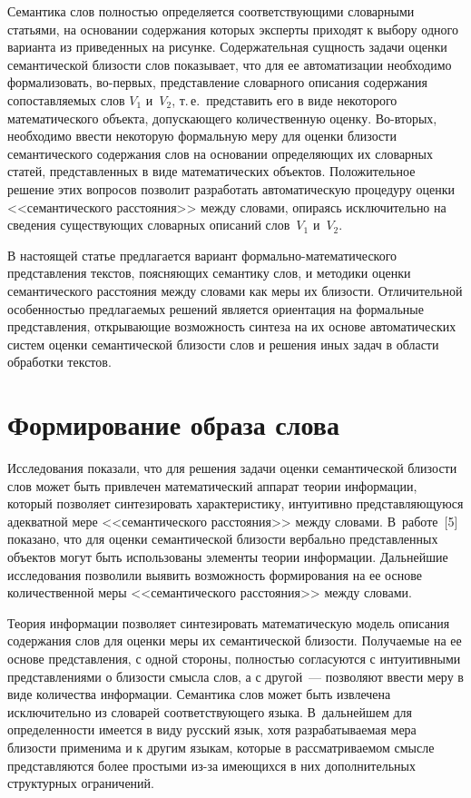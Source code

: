 \begin{multicols}{2}
     Семантика слов полностью определяется соответствующими словарными 
статьями, на основании содержания которых эксперты приходят к выбору 
одного варианта из приведенных на рисунке. Содержательная сущность задачи 
оценки семантической близости слов показывает, что для ее автоматизации 
необходимо формализовать, во-пер\-вых, представление словарного описания 
содержания сопоставляемых слов $V_1$ и~$V_2$, т.\,е.\ представить его в виде 
некоторого математического объекта, допускающего количественную оценку. 
Во-вто\-рых, необходимо ввести некоторую формальную меру для оценки 
близости семантического содержания слов на основании определяющих их 
словарных статей, представленных в виде математических объектов. 
Положительное решение этих вопросов позволит разработать автоматическую 
процедуру оценки <<семантического расстояния>> между словами, опираясь 
исключительно на сведения существующих словарных описаний слов~$V_1$ 
и~$V_2$. 
     
     В настоящей статье предлагается вариант 
     фор\-маль\-но-ма\-те\-ма\-ти\-че\-ско\-го представления текстов, 
поясняющих семантику слов, и методики оценки семантического расстояния 
между словами как меры их близости. Отличительной особен\-ностью 
предлагаемых решений является ориентация на формальные представления, 
открывающие возможность синтеза на их основе автоматических сис\-тем 
оценки семантической близости слов и решения иных задач в об\-ласти 
обработки текстов. 
     
\section{Формирование образа слова}

      Исследования показали, что для решения задачи оценки семантической 
близости слов может быть привлечен математический аппарат теории 
информации, который позволяет синтезировать характеристику, интуитивно 
представляющуюся адекватной мере <<семантического расстояния>> между 
словами. В~работе~[5] показано, что для оценки семантической близости 
вербально представленных объектов могут быть использованы элементы 
теории информации. Дальнейшие исследования позволили выявить 
возможность формирования на ее основе количественной меры 
<<семантического расстояния>> между словами.
     
     Теория информации позволяет синтезировать математическую модель 
описания содержания слов для оценки меры их семантической близости. 
Получаемые на ее основе представления, с одной стороны, полностью 
согласуются с интуитивными представлениями о близости смысла слов, а с 
другой~--- позволяют ввести меру в виде количества информации. Семантика 
слов может быть извлечена исключительно из словарей соответствующего 
языка. В~дальнейшем для определенности имеется в виду русский язык, хотя 
разрабатываемая мера близости применима и к другим языкам, которые в 
рассматриваемом смысле представляются более простыми из-за имеющихся в 
них дополнительных структурных ограничений. 
     

\end{multicols}
